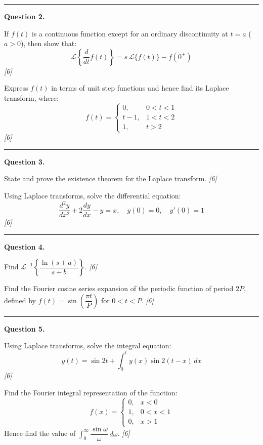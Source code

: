 \documentclass[11pt,a4paper]{article}
\newcommand{\pts}[1]{\hfill   \textit{[#1]}}
\begin{document}
\medskip\rule{\linewidth}{0.2pt}

\medskip


\noindent   \textbf{Question 2.}

\begin{parts}
  \item If $f(t)$ is a continuous function except for an ordinary discontinuity at $t = a$ ($a > 0$), then show that:
  \[
  \mathcal{L}\!\left\{\frac{d}{dt}f(t)\right\} = s\,\mathcal{L}\{f(t)\} - f(0^+)
  \] \pts{6}
  \item Express $f(t)$ in terms of unit step functions and hence find its Laplace transform, where:
  \[
  f(t) = 
\begin{cases} 0, & 0 < t < 1 \\ t-1, & 1 < t < 2 \\ 1, & t > 2 \end{cases}
  \] \pts{6}
\end{parts}

\medskip\rule{\linewidth}{0.2pt}

\medskip


\noindent   \textbf{Question 3.}

\begin{parts}
  \item State and prove the existence theorem for the Laplace transform. \pts{6}
  \item Using Laplace transforms, solve the differential equation:
  \[
  \frac{d^2y}{dx^2} + 2\frac{dy}{dx} - y = x, \quad y(0) = 0,\quad y'(0) = 1
  \] \pts{6}
\end{parts}

\medskip\rule{\linewidth}{0.2pt}

\medskip


\noindent   \textbf{Question 4.}

\begin{parts}
  \item Find $\mathcal{L}^{-1}\!\left\{\dfrac{\ln(s+a)}{s+b}\right\}$. \pts{6}
  \item Find the Fourier cosine series expansion of the periodic function of period $2P$, defined by $f(t) = \sin\!\left(\dfrac{\pi t}{P}\right)$ for $0 < t < P$. \pts{6}
\end{parts}

\medskip\rule{\linewidth}{0.2pt}

\medskip


\noindent   \textbf{Question 5.}

\begin{parts}
  \item Using Laplace transforms, solve the integral equation:
  \[
  y(t) = \sin 2t + \int_0^t y(x)\sin 2(t-x)\,dx
  \] \pts{6}
  \item Find the Fourier integral representation of the function:
  \[
  f(x) = 
\begin{cases} 0, & x < 0 \\ 1, & 0 < x < 1 \\ 0, & x > 1 \end{cases}
  \]
  Hence find the value of $\int_0^\infty \dfrac{\sin\omega}{\omega}\,d\omega$. \pts{6}
\end{parts}
\end{document}
